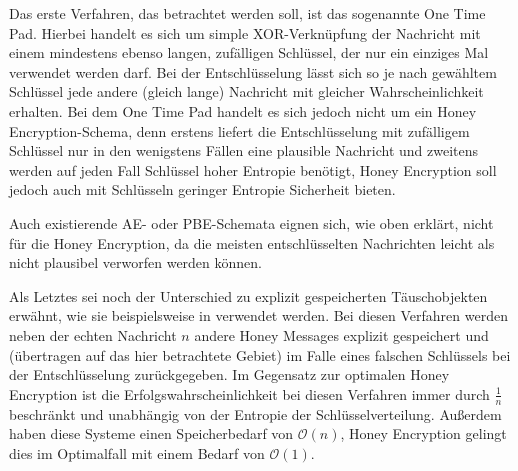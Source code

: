 Das erste Verfahren, das betrachtet werden soll, ist das sogenannte One Time Pad. Hierbei handelt es sich um simple XOR-Verknüpfung der Nachricht mit einem mindestens ebenso langen, zufälligen Schlüssel, der nur ein einziges Mal verwendet werden darf. Bei der Entschlüsselung lässt sich so je nach gewähltem Schlüssel jede andere (gleich lange) Nachricht mit gleicher Wahrscheinlichkeit erhalten. Bei dem One Time Pad handelt es sich jedoch nicht um ein Honey Encryption-Schema, denn erstens liefert die Entschlüsselung mit zufälligem Schlüssel nur in den wenigstens Fällen eine plausible Nachricht und zweitens werden auf jeden Fall Schlüssel hoher Entropie benötigt, Honey Encryption soll jedoch auch mit Schlüsseln geringer Entropie Sicherheit bieten.

Auch existierende AE- oder PBE-Schemata eignen sich, wie oben erklärt, nicht für die Honey Encryption, da die meisten entschlüsselten Nachrichten leicht als nicht plausibel verworfen werden können.

Als Letztes sei noch der Unterschied zu explizit gespeicherten Täuschobjekten erwähnt, wie sie beispielsweise in \cite{ACM13} verwendet werden. Bei diesen Verfahren werden neben der echten Nachricht \(n\) andere Honey Messages explizit gespeichert und (übertragen auf das hier betrachtete Gebiet) im Falle eines falschen Schlüssels bei der Entschlüsselung zurückgegeben. Im Gegensatz zur optimalen Honey Encryption ist die Erfolgswahrscheinlichkeit bei diesen Verfahren immer durch \(\frac{1}{n}\) beschränkt und unabhängig von der Entropie der Schlüsselverteilung. Außerdem haben diese Systeme einen Speicherbedarf von \(\mathcal{O}(n)\), Honey Encryption gelingt dies im Optimalfall mit einem Bedarf von \(\mathcal{O}(1)\).

\newpage